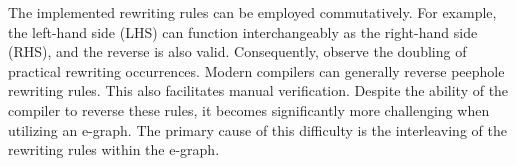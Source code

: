 The implemented rewriting rules can be employed commutatively. 
For example, the left-hand side (LHS) can function interchangeably as the right-hand side (RHS), and the reverse is also valid. 
Consequently, observe the doubling of practical rewriting occurrences. 
Modern compilers can generally reverse peephole rewriting rules.  
This also facilitates manual verification. 
Despite the ability of the compiler to reverse these rules, it becomes significantly more challenging when utilizing an e-graph. 
The primary cause of this difficulty is the interleaving of the rewriting rules within the e-graph.

